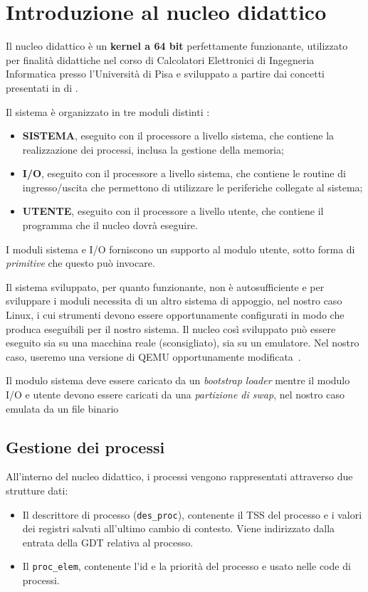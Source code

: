 \chapter{Introduzione al nucleo didattico}
\label{cap:nucleo}
Il nucleo didattico è un \textbf{kernel a 64 bit} perfettamente funzionante, utilizzato per finalità didattiche nel corso di Calcolatori Elettronici di Ingegneria Informatica presso l'Università di Pisa e sviluppato a partire dai concetti presentati in  di \citeauthor{frosini:calcolatori3}\cite{frosini:calcolatori3}.

Il sistema è organizzato in tre moduli distinti \cite{lettieri:nucleo}:
\begin{itemize}
	\item \textbf{SISTEMA}, eseguito con il processore a livello sistema, che contiene la realizzazione dei processi, inclusa la gestione della memoria;
	\item \textbf{I/O}, eseguito con il processore a livello sistema, che contiene le routine di ingresso/uscita che permettono di utilizzare le periferiche collegate al sistema;
	\item \textbf{UTENTE}, eseguito con il processore a livello utente, che contiene il programma che il nucleo dovrà eseguire.
\end{itemize}
I moduli sistema e I/O forniscono un supporto al modulo utente, sotto forma di \emph{primitive} che questo può invocare.

Il sistema sviluppato, per quanto funzionante, non è autosufficiente e per sviluppare i moduli necessita di un altro sistema di appoggio, nel nostro caso Linux, i cui strumenti devono essere opportunamente configurati in modo che produca eseguibili per il nostro sistema. Il nucleo così sviluppato può essere eseguito sia su una macchina reale (sconsigliato), sia su un emulatore. Nel nostro caso, useremo una versione di QEMU opportunamente modificata~\cite{lettieri:istruzioni-nucleo}.

Il modulo sistema deve essere caricato da un \emph{bootstrap loader} mentre il modulo I/O e utente devono essere caricati da una \emph{partizione di swap}, nel nostro caso emulata da un file binario

\section{Gestione dei processi}
All'interno del nucleo didattico, i processi vengono rappresentati attraverso due strutture dati:
\begin{itemize}
	\item Il descrittore di processo (\texttt{des\_proc}), contenente il TSS del processo e i valori dei registri salvati all'ultimo cambio di contesto. Viene indirizzato dalla entrata della GDT relativa al processo.
	\item Il \texttt{proc\_elem}, contenente l'id e la priorità del processo e usato nelle code di processi.
\end{itemize}

